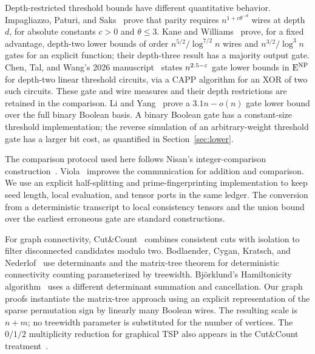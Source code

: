 Depth-restricted threshold bounds have different quantitative behavior.
Impagliazzo, Paturi, and Saks~\cite{IPS97} prove that parity requires
$n^{1+c\theta^{-d}}$ wires at depth $d$, for absolute constants $c>0$
and $\theta\le3$. Kane and Williams~\cite{KW16} prove, for a fixed
advantage, depth-two lower bounds of order
$n^{5/2}/\log^{7/2}n$ wires and $n^{3/2}/\log^3n$ gates for an explicit
function; their depth-three result has a majority output gate.
Chen, Tal, and Wang's 2026 manuscript~\cite[Theorems 1.1--1.2]{CTW26}
states $n^{2.5-\varepsilon}$ gate lower bounds in $\mathrm{E}^{\mathrm{NP}}$ for depth-two linear
threshold circuits, via a CAPP algorithm for an XOR of two such
circuits. These gate and wire measures and their depth restrictions
are retained in the comparison. Li and Yang~\cite{LiYang22} prove a
$3.1n-o(n)$ gate lower bound over the full binary Boolean basis. A
binary Boolean gate has a constant-size threshold implementation; the
reverse simulation of an arbitrary-weight threshold gate has a larger
bit cost, as quantified in Section~\ref{sec:lower}.

The comparison protocol used here follows Nisan's
integer-comparison construction~\cite{Nisan93}. Viola~\cite{Viola15}
improves the communication for addition and comparison. We use an
explicit half-splitting and prime-fingerprinting implementation to keep
seed length, local evaluation, and tensor ports in the same ledger.
The conversion from a deterministic transcript to local consistency
tensors and the union bound over the earliest erroneous gate are standard constructions.

For graph connectivity, Cut\&Count~\cite{CutCount11} combines consistent
cuts with isolation to filter disconnected candidates modulo two.
Bodlaender, Cygan, Kratsch, and Nederlof~\cite[Section 4]{BCKN15}
use determinants and the matrix-tree theorem for deterministic
connectivity counting parameterized by treewidth. Bj\"orklund's
Hamiltonicity algorithm~\cite{Bjorklund14} uses a different determinant
summation and cancellation. Our graph proofs instantiate the
matrix-tree approach using an explicit representation of the sparse
permutation sign by linearly many Boolean wires. The resulting scale is
$n+m$; no treewidth parameter is substituted for the number of vertices.
The $0/1/2$ multiplicity reduction for graphical TSP also appears in
the Cut\&Count treatment~\cite[Section 4.10]{CutCount11}.

